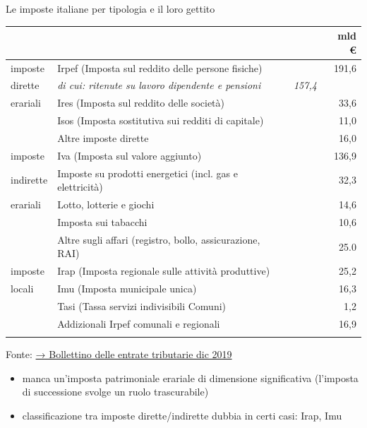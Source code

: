 \documentclass[aspectratio=64,11pt]{beamer}
\begin{document}
\begin{frame}{Le imposte italiane per tipologia e il loro gettito}
\vspace{-3mm}
\footnotesize
\begin{center}
\begin{tabular}{llrr}
 &  &  & mld €\\[0pt]
\hline
imposte & \alert{Irpef} (Imposta sul reddito delle persone fisiche) &  & 191,6\\[0pt]
dirette & \emph{di cui: ritenute su lavoro dipendente e pensioni} & \emph{157,4} & \\[0pt]
erariali & \alert{Ires} (Imposta sul reddito delle società) &  & 33,6\\[0pt]
 & \alert{Isos} (Imposta sostitutiva sui redditi di capitale) &  & 11,0\\[0pt]
 & Altre imposte dirette &  & 16,0\\[0pt]
\hline
imposte & \alert{Iva} (Imposta sul valore aggiunto) &  & 136,9\\[0pt]
indirette & Imposte su prodotti energetici (incl. gas e elettricità) &  & 32,3\\[0pt]
erariali & Lotto, lotterie e giochi &  & 14,6\\[0pt]
 & Imposta sui tabacchi &  & 10,6\\[0pt]
 & Altre sugli affari (registro, bollo, assicurazione, RAI) &  & 25.0\\[0pt]
\hline
imposte & \alert{Irap} (Imposta regionale sulle attività produttive) &  & 25,2\\[0pt]
locali & \alert{Imu} (Imposta municipale unica) &  & 16,3\\[0pt]
 & \alert{Tasi} (Tassa servizi indivisibili Comuni) &  & 1,2\\[0pt]
 & Addizionali Irpef comunali e regionali &  & 16,9\\[0pt]
 &  &  & \\[0pt]
\end{tabular}
\end{center}
\tiny Fonte: \href{https://www.finanze.gov.it/export/sites/finanze/.galleries/Documenti/entrate\_tributarie\_2019/Bollettino-entrate-Dicembre2019.pdf}{→ Bollettino delle entrate tributarie dic 2019}

\small
\begin{itemize}
\item manca un'imposta patrimoniale erariale di dimensione significativa
(l'imposta di successione svolge un ruolo trascurabile)
\item classificazione tra imposte dirette/indirette dubbia in certi casi: Irap, Imu
\end{itemize}
\end{frame}
\end{document}
